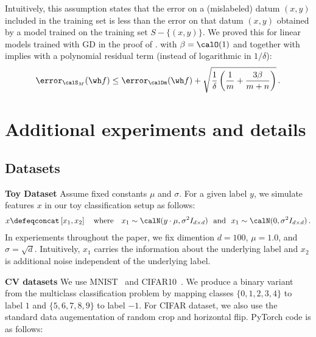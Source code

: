 Intuitively, this assumption states that the error on a (mislabeled) datum $(x,y)$ included in the training set is less than the error on that datum $(x,y)$ obtained by a model trained on the training set $S - \{(x,y)\}$. We proved this for linear models trained with GD in the proof of . 
% 
 with $\beta = \calO(1)$ and  together with  implies  with a polynomial residual term (instead of logarithmic in $1/\delta$): 
\begin{align}
     \error_{\calS_M} (\wh f) \le  \error_{\calDm}(\wh f)   + \sqrt{\frac{1}{\delta}\left(\frac{1}{m} +\frac{3\beta}{m+n} \right)} \,.
\end{align}

\newpage 
\section{Additional experiments and details}\label{app:exp}
\newcommand\tab[1][1cm]{\hspace*{#1}}

\subsection{Datasets} \label{sec:app_dataset}

\textbf{Toy Dataset {} {}} Assume fixed constants $\mu$ and $\sigma$. For a given label $y$, we simulate features $x$ in our toy classification setup as follows: 
\begin{align*}
    x \defeq \texttt{concat} \left[ x_1, x_2\right] \quad \text{where} \quad  x_1 \sim  \calN( y \cdot \mu, \sigma^2 I_{d \times d}) \ \  \text{and} \ \  x_1 \sim  \calN( 0, \sigma^2 I_{d \times d}) \,.
\end{align*}  
In experiements throughout the paper, we fix dimention $d=100$, $\mu = 1.0 $, and $\sigma = \sqrt{d}$. Intuitively, $x_1$ carries the information about the underlying label and $x_2$ is additional noise independent of the underlying label. 

\textbf{CV datasets {} {}} We use MNIST~\citep{lecun1998mnist} and CIFAR10~\cite{krizhevsky2009learning}. 
We produce a binary variant from the multiclass classification problem by mapping classes $\{0,1,2,3,4\}$ to label $1$ and $\{ 5,6,7,8,9\}$ to label $-1$. For CIFAR dataset, we also use the standard data augementation of random crop and horizontal flip. PyTorch code is as follows: 

